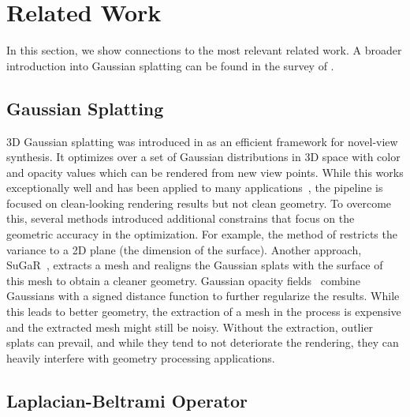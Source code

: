 \section{Related Work}
In this section, we show connections to the most relevant related work. A broader introduction into Gaussian splatting can be found in the survey of \cite{chen2024survey3dgaussiansplatting}.

\subsection{Gaussian Splatting}\label{sub:rw:gaussian}

3D Gaussian splatting was introduced in \cite{kerbl3Dgaussians} as an efficient framework for novel-view synthesis. 
It optimizes over a set of Gaussian distributions in 3D space with color and opacity values which can be rendered from new view points. 
While this works exceptionally well and has been applied to many applications~\cite{SplattingAvatar:CVPR2024,yan2024street}, the pipeline is focused on clean-looking rendering results but not clean geometry. 
To overcome this, several methods introduced additional constrains that focus on the geometric accuracy in the optimization. 
For example, the method of \cite{Huang2DGS2024} restricts the variance to a 2D plane (the dimension of the surface). 
Another approach, SuGaR~\cite{guedon2023sugar}, extracts a mesh and realigns the Gaussian splats with the surface of this mesh to obtain a cleaner geometry. 
Gaussian opacity fields~\cite{yu2024gaussian} combine Gaussians with a signed distance function to further regularize the results. 
While this leads to better geometry, the extraction of a mesh in the process is expensive and the extracted mesh might still be noisy. Without the extraction, outlier splats can prevail, and while they tend to not deteriorate the rendering, they can heavily interfere with geometry processing applications.


\subsection{Laplacian-Beltrami Operator}\label{sub:rw:lbo}

